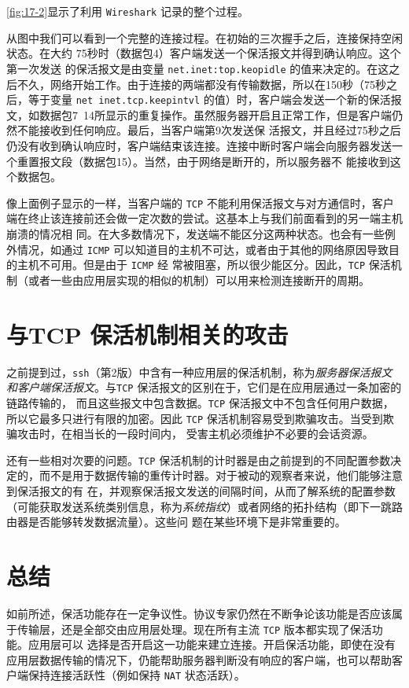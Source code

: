 \ref{fig:17-2}显示了利用 \verb|Wireshark| 记录的整个过程。

从图中我们可以看到一个完整的连接过程。在初始的三次握手之后，连接保持空闲状态。在大约 75秒时（数据包4）客户端发送一个保活报文并得到确认响应。这个第一次发送
的保活报文是由变量 \verb|net.inet:top.keopidle| 的值来决定的。在这之后不久，网络开始工作。由于连接的两端都没有传输数据，所以在150秒（75秒之后，等于变量 \verb|net inet.tcp.keepintvl|
的值）时，客户端会发送一个新的保活报文，如数据包7~14所显示的重复操作。虽然服务器开启且正常工作，但是客户端仍然不能接收到任何响应。最后，当客户端第9次发送保
活报文，并且经过75秒之后仍没有收到确认响应时，客户端结束该连接。连接中断时客户端会向服务器发送一个重置报文段（数据包15）。当然，由于网络是断开的，所以服务器不
能接收到这个数据包。

像上面例子显示的一样，当客户端的 \verb|TCP| 不能利用保活报文与对方通信时，客户端在终止该连接前还会做一定次数的尝试。这基本上与我们前面看到的另一端主机崩溃的情况相
同。在大多数情况下，发送端不能区分这两种状态。也会有一些例外情况，如通过 \verb|ICMP| 可以知道目的主机不可达，或者由于其他的网络原因导致目的主机不可用。但是由于 \verb|ICMP| 经
常被阻塞，所以很少能区分。因此，\verb|TCP| 保活机制（或者一些由应用层实现的相似的机制）可以用来检测连接断开的周期。

\section{与TCP 保活机制相关的攻击}
之前提到过，\verb|ssh|（第2版）中含有一种应用层的保活机制，称为\emph{服务器保活报文和客户端保活报文}。与\verb|TCP| 保活报文的区别在于，它们是在应用层通过一条加密的链路传输的，
而且这些报文中包含数据。\verb|TCP| 保活报文中不包含任何用户数据，所以它最多只进行有限的加密。因此 \verb|TCP| 保活机制容易受到欺骗攻击。当受到欺骗攻击时，在相当长的一段时间内，
受害主机必须维护不必要的会话资源。

还有一些相对次要的问题。\verb|TCP| 保活机制的计时器是由之前提到的不同配置参数决定的，而不是用于数据传输的重传计时器。对于被动的观察者来说，他们能够注意到保活报文的有
在，并观察保活报文发送的间隔时间，从而了解系统的配置参数（可能获取发送系统类别信息，称为\emph{系统指纹}）或者网络的拓扑结构（即下一跳路由器是否能够转发数据流量）。这些问
题在某些环境下是非常重要的。

\section{总结}
如前所述，保活功能存在一定争议性。协议专家仍然在不断争论该功能是否应该属于传输层，还是全部交由应用层处理。现在所有主流 \verb|TCP| 版本都实现了保活功能。应用层可以
选择是否开启这一功能来建立连接。开启保活功能，即使在没有应用层数据传输的情况下，仍能帮助服务器判断没有响应的客户端，也可以帮助客户端保持连接活跃性（例如保持 \verb|NAT|
状态活跃）。

